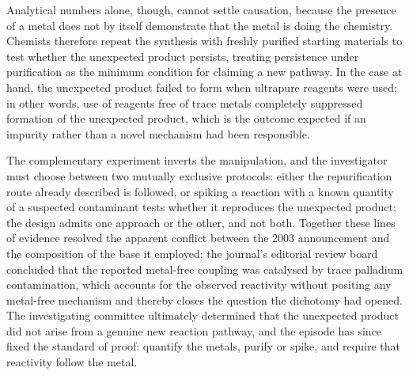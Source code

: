 \documentclass[11pt]{article}
\begin{document}
{Analytical numbers alone, though, cannot settle causation, because the presence of a metal does not by itself demonstrate that the metal is doing the chemistry. Chemists therefore repeat the synthesis with freshly purified starting materials to test whether the unexpected product persists, treating persistence under purification as the minimum condition for claiming a new pathway. In the case at hand, the unexpected product failed to form when ultrapure reagents were used; in other words, use of reagents free of trace metals completely suppressed formation of the unexpected product, which is the outcome expected if an impurity rather than a novel mechanism had been responsible.

The complementary experiment inverts the manipulation, and the investigator must choose between two mutually exclusive protocols: either the repurification route already described is followed, or spiking a reaction with a known quantity of a suspected contaminant tests whether it reproduces the unexpected product; the design admits one approach or the other, and not both. Together these lines of evidence resolved the apparent conflict between the 2003 announcement and the composition of the base it employed: the journal's editorial review board concluded that the reported metal-free coupling was catalysed by trace palladium contamination, which accounts for the observed reactivity without positing any metal-free mechanism and thereby closes the question the dichotomy had opened. The investigating committee ultimately determined that the unexpected product did not arise from a genuine new reaction pathway, and the episode has since fixed the standard of proof: quantify the metals, purify or spike, and require that reactivity follow the metal.}
\end{document}
